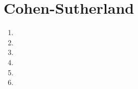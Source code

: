 \section*{Cohen-Sutherland}

	\begin{enumerate}\addtocounter{enumi}{21}
		\item 
		
		\item 
		
		\item
		
		\item 
		
		\item 
		
		\item 
	\end{enumerate}
